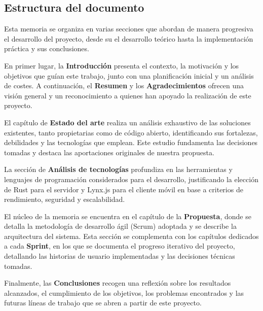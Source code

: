 \subsection{Estructura del documento}
Esta memoria se organiza en varias secciones que abordan de manera progresiva el desarrollo del proyecto, desde su el desarrollo teórico hasta la implementación práctica y sus conclusiones.

En primer lugar, la \textbf{Introducción} presenta el contexto, la motivación y los objetivos que guían este trabajo, junto con una planificación inicial y un análisis de costes. A continuación, el \textbf{Resumen} y los \textbf{Agradecimientos} ofrecen una visión general y un reconocimiento a quienes han apoyado la realización de este proyecto.

El capítulo de \textbf{Estado del arte} realiza un análisis exhaustivo de las soluciones existentes, tanto propietarias como de código abierto, identificando sus fortalezas, debilidades y las tecnologías que emplean. Este estudio fundamenta las decisiones tomadas y destaca las aportaciones originales de nuestra propuesta.

La sección de \textbf{Análisis de tecnologías} profundiza en las herramientas y lenguajes de programación considerados para el desarrollo, justificando la elección de Rust para el servidor y Lynx.js para el cliente móvil en base a criterios de rendimiento, seguridad y escalabilidad.

El núcleo de la memoria se encuentra en el capítulo de la \textbf{Propuesta}, donde se detalla la metodología de desarrollo ágil (Scrum) adoptada y se describe la arquitectura del sistema. Esta sección se complementa con los capítulos dedicados a cada \textbf{Sprint}, en los que se documenta el progreso iterativo del proyecto, detallando las historias de usuario implementadas y las decisiones técnicas tomadas.

Finalmente, las \textbf{Conclusiones} recogen una reflexión sobre los resultados alcanzados, el cumplimiento de los objetivos, los problemas encontrados y las futuras líneas de trabajo que se abren a partir de este proyecto.
